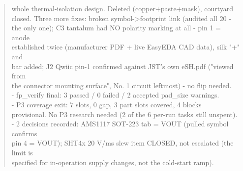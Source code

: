 \documentclass[11pt,a4paper]{article}
\begin{document}
\begin{quote}
  whole thermal-isolation design. Deleted (copper+paste+mask), courtyard\\
  closed. Three more fixes: broken symbol-\textgreater{}footprint link (audited all 20 -\\
  the only one); C3 tantalum had NO polarity marking at all - pin 1 = anode\\
  established twice (manufacturer PDF + live EasyEDA CAD data), silk "+" and\\
  bar added; J2 Qwiic pin-1 confirmed against JST's own eSH.pdf ("viewed from\\
  the connector mounting surface", No. 1 circuit leftmost) - no flip needed.\\
- fp\_verify final: 3 passed / 0 failed / 2 accepted pad\_size warnings.\\
- P3 coverage exit: 7 slots, 0 gap, 3 part slots covered, 4 blocks\\
  provisional. No P3 research needed (2 of the 6 per-run tasks still unspent).\\
- 2 decisions recorded: AMS1117 SOT-223 tab = VOUT (pulled symbol confirms\\
  pin 4 = VOUT); SHT4x 20 V/ms slew item CLOSED, not escalated (the limit is\\
  specified for in-operation supply changes, not the cold-start ramp).
\end{quote}
\end{document}
